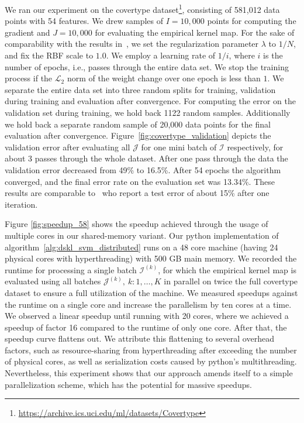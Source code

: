 \documentclass{article} %
\begin{document}
We ran our experiment on the covertype dataset\footnote{\url{https://archive.ics.uci.edu/ml/datasets/Covertype}}, consisting of 581,012 data points with 54 features. We drew samples of $I=10,000$ points for computing the gradient and $J=10,000$ for evaluating the empirical kernel map. For the sake of comparability with the results in~\cite{Dai2014}, we set the regularization parameter $\lambda$ to $1 / N$, and fix the RBF scale to $1.0$. We employ a learning rate of $1/i$, where $i$ is the number of epochs, i.e., passes through the entire data set. We stop the training process if the $\mathcal{L}_{2}$ norm of the weight change over one epoch is less than $1$. We separate the entire data set into three random splits for training, validation during training and evaluation after convergence. For computing the error on the validation set during training, we hold back 1122 random samples. Additionally we hold back a separate random sample of 20,000 data points for the final evaluation after convergence. Figure~\ref{fig:covertype_validation} depicts the validation error after evaluating all $\mathcal{J}$ for one mini batch of $\mathcal{I}$ respectively, for about 3 passes through the whole dataset. After one pass through the data the validation error decreased from 49\% to 16.5\%. After 54 epochs the algorithm converged, and the final error rate on the evaluation set was 13.34\%. These results are comparable to~\cite{Dai2014} who report a test error of about 15\% after one iteration. 

Figure \ref{fig:speedup_58} shows the speedup achieved through the usage of multiple cores in our shared-memory variant. 
Our python implementation of algorithm~\autoref{alg:dskl_svm_distributed} runs on a 48 core machine (having 24 physical cores with hyperthreading) with 500 GB main memory. 
We recorded the runtime for processing a single batch $\mathcal{I}^{(k)}$, for which the empirical kernel map is evaluated using all batches $\mathcal{J}^{(k)},~k: 1,\dots,K$ in parallel on twice the full covertype dataset to ensure a full utilization of the machine. We measured speedups against the runtime on a single core and increase the parallelism by ten cores at a time.  We observed a linear speedup until running with 20 cores, where we achieved a speedup of factor 16 compared to the runtime of only one core. After that, the speedup curve flattens out. We attribute this flattening to several overhead factors, such as resource-sharing from hyperthreading after exceeding the number of physical cores, as well as serialization costs caused by python's multithreading. Nevertheless, this experiment shows that our approach amends itself to a simple parallelization scheme, which has the potential for massive speedups.
\end{document}
